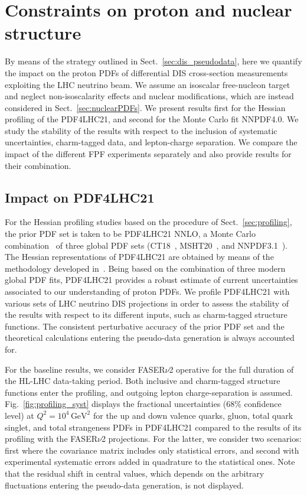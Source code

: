 \section{Constraints on proton and nuclear structure}
\label{sec:protonPDFs}

By means of the strategy outlined in Sect.~\ref{sec:dis_pseudodata}, here
we quantify the impact on the proton PDFs
of differential  DIS
cross-section measurements exploiting the  LHC
neutrino beam. 
%
We assume an isoscalar free-nucleon target and neglect non-isoscalarity effects and nuclear modifications,
which are instead considered in Sect.~\ref{sec:nuclearPDFs}.
%
We present results first for the Hessian profiling of the PDF4LHC21,
and second for the Monte Carlo fit NNPDF4.0.
%
We study the stability of the results with respect to the inclusion of systematic uncertainties,
charm-tagged data, and lepton-charge separation.
%
We compare the impact of the different FPF experiments separately and also provide
results for their combination.

\subsection{Impact on PDF4LHC21}
\label{sec:pdf4lhc21}

For the Hessian profiling studies based on the procedure of Sect.~\ref{sec:profiling}, the prior PDF set is taken to
be PDF4LHC21 NNLO, a Monte Carlo combination~\cite{Watt:2012tq,Carrazza:2015hva} of three global PDF sets (CT18~\cite{Hou:2019efy},
MSHT20~\cite{Bailey:2020ooq}, and NNPDF3.1~\cite{NNPDF:2017mvq}).
%
The Hessian representations of PDF4LHC21 are obtained by means of the methodology developed in~\cite{Gao:2013bia,Carrazza:2015aoa}.
%
Being based on the combination of three modern global PDF fits, PDF4LHC21 provides a robust estimate
of  current uncertainties associated to our understanding of proton PDFs.
%
We profile PDF4LHC21 with various sets of LHC neutrino DIS projections in order to assess the stability
of the results with respect to its different inputs, such as charm-tagged structure functions.
%
The consistent perturbative accuracy of the prior PDF set and the theoretical calculations entering
the pseudo-data generation is always accounted for.

For the baseline results, we consider FASER$\nu$2 operative for the full duration
of the HL-LHC data-taking period.
%
Both inclusive and charm-tagged structure functions enter the profiling,
and outgoing lepton charge-separation is assumed.
%
Fig.~\ref{fig:profiling_syst} displays the
fractional uncertainties   (68\% confidence level) at $Q^2 = 10^4 \, \textrm{GeV}^2$ 
for the up and down valence quarks, gluon, total quark singlet, and total strangeness PDFs
in PDF4LHC21 compared to the results of its profiling with the FASER$\nu$2 projections.
%
For the latter, we consider two scenarios: first where the covariance matrix includes
only statistical errors, and second with experimental systematic
errors added in quadrature to the statistical ones.
%
Note that the residual shift in central values, which depends on the arbitrary fluctuations
entering the pseudo-data generation, is not displayed.

